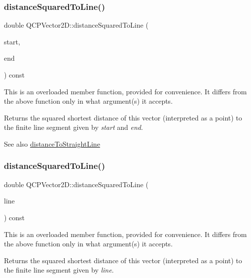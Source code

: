 \subsubsection{\texorpdfstring{distance\+Squared\+To\+Line()}{distanceSquaredToLine()}\hspace{0.1cm}{\footnotesize\ttfamily [1/2]}}
{\footnotesize\ttfamily double Q\+C\+P\+Vector2\+D\+::distance\+Squared\+To\+Line (\begin{DoxyParamCaption}\item[{const \hyperlink{classQCPVector2D}{Q\+C\+P\+Vector2D} \&}]{start,  }\item[{const \hyperlink{classQCPVector2D}{Q\+C\+P\+Vector2D} \&}]{end }\end{DoxyParamCaption}) const}

This is an overloaded member function, provided for convenience. It differs from the above function only in what argument(s) it accepts.

Returns the squared shortest distance of this vector (interpreted as a point) to the finite line segment given by {\itshape start} and {\itshape end}.

\begin{DoxySeeAlso}{See also}
\hyperlink{classQCPVector2D_ae240b845c3744e43a5d0aa7b2bb66c19}{distance\+To\+Straight\+Line} 
\end{DoxySeeAlso}
\mbox{\label{classQCPVector2D_a0c44ca97d46ee04feec32c1c57e70831}} 
\subsubsection{\texorpdfstring{distance\+Squared\+To\+Line()}{distanceSquaredToLine()}\hspace{0.1cm}{\footnotesize\ttfamily [2/2]}}
{\footnotesize\ttfamily double Q\+C\+P\+Vector2\+D\+::distance\+Squared\+To\+Line (\begin{DoxyParamCaption}\item[{const Q\+LineF \&}]{line }\end{DoxyParamCaption}) const}

This is an overloaded member function, provided for convenience. It differs from the above function only in what argument(s) it accepts.

Returns the squared shortest distance of this vector (interpreted as a point) to the finite line segment given by {\itshape line}.


